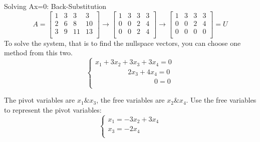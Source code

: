 \documentclass{beamer}
\begin{document}
\begin{frame}{Solving Ax=0: Back-Substitution}
    \begin{equation*}
        A=\left[ \begin{matrix}
            1&		3&		3&		3\\
            2&		6&		8&		10\\
            3&		9&		11&		13\\
        \end{matrix} \right] \rightarrow \left[ \begin{matrix}
            1&		3&		3&		3\\
            0&		0&		2&		4\\
            0&		0&		2&		4\\
        \end{matrix} \right] \rightarrow \left[ \begin{matrix}
            1&		3&		3&		3\\
            0&		0&		2&		4\\
            0&		0&		0&		0\\
        \end{matrix} \right] =U
    \end{equation*}
To solve the system, that is to find the nullspace vectors, you can choose one method from this two.
\begin{equation*}
    \begin{cases}
        x_1+3x_2+3x_3+3x_4=0\\
        \qquad\qquad\ \ \:           2x_3+4x_4=0\\
        \qquad\qquad\qquad\qquad\:\:                     0=0\\
    \end{cases}
\end{equation*}

The pivot variables are $x_1\&x_3$, the free variables are $x_2\&x_4$. Use the free variables to represent the pivot variables:
\begin{equation*}
    \begin{cases}
        x_1=-3x_2+3x_4\\
        x_3=-2x_4\\
    \end{cases}
\end{equation*}
\end{frame}
\end{document}
